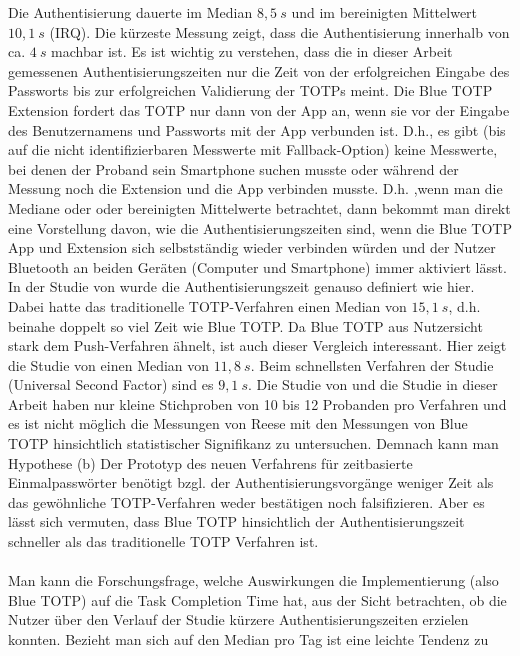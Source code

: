 Die Authentisierung dauerte im Median $8{,}5~s$ und im bereinigten Mittelwert 
$10,1~s$ (IRQ). Die kürzeste Messung zeigt, dass die Authentisierung innerhalb 
von ca. $4~s$ machbar ist. Es ist wichtig zu verstehen, dass die in dieser 
Arbeit gemessenen Authentisierungszeiten nur die Zeit von der erfolgreichen 
Eingabe des Passworts bis zur erfolgreichen Validierung der TOTPs meint. Die 
Blue TOTP Extension fordert das TOTP nur dann von der App an, wenn sie vor der 
Eingabe des Benutzernamens und Passworts mit der App verbunden ist. D.h., es 
gibt (bis auf die nicht identifizierbaren Messwerte mit Fallback-Option) keine 
Messwerte, bei denen der Proband sein Smartphone suchen musste oder während 
der Messung noch die Extension und die App verbinden musste. D.h. ,wenn man 
die Mediane oder oder bereinigten Mittelwerte betrachtet, dann bekommt man 
direkt eine Vorstellung davon, wie die Authentisierungszeiten sind, wenn die 
Blue TOTP App und Extension sich selbstständig wieder verbinden würden und der 
Nutzer Bluetooth an beiden Geräten (Computer und Smartphone) immer aktiviert 
lässt. In der Studie von \textcite{Reese} wurde die Authentisierungszeit 
genauso definiert wie hier. Dabei hatte das traditionelle TOTP-Verfahren einen 
Median von $15,1~s$, d.h. beinahe doppelt so viel Zeit wie Blue TOTP. Da Blue 
TOTP aus Nutzersicht stark dem Push-Verfahren ähnelt, ist auch dieser 
Vergleich interessant. Hier zeigt die Studie von \textcite{Resse} einen Median 
von $11{,}8~s$. Beim schnellsten Verfahren der Studie (Universal Second 
Factor) sind es $9{,}1~s$. Die Studie von \textcite{Reese} und die Studie in 
dieser Arbeit haben nur kleine Stichproben von 10 bis 12 Probanden pro 
Verfahren und es ist nicht möglich die Messungen von Reese mit den Messungen 
von Blue TOTP hinsichtlich statistischer Signifikanz zu untersuchen. Demnach 
kann man Hypothese (b) \glqq Der Prototyp des neuen Verfahrens für 
zeitbasierte Einmalpasswörter benötigt bzgl. der Authentisierungsvorgänge 
weniger Zeit als das gewöhnliche TOTP-Verfahren\grqq{} weder bestätigen noch 
falsifizieren. Aber es lässt sich vermuten, dass Blue TOTP hinsichtlich der 
Authentisierungszeit schneller als das traditionelle TOTP Verfahren ist.
\\\\
Man kann die Forschungsfrage, welche Auswirkungen die Implementierung (also 
Blue TOTP) auf die Task Completion Time hat, aus der Sicht betrachten, ob die 
Nutzer über den Verlauf der Studie kürzere Authentisierungszeiten erzielen 
konnten. Bezieht man sich auf den Median pro Tag ist eine leichte Tendenz zu 
